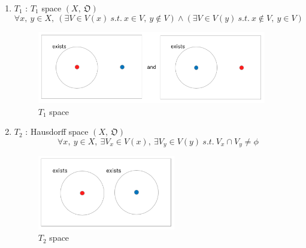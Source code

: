 \documentclass[english,dvipdfmx]{jsarticle}
\begin{document}
\begin{description}
\begin{enumerate}
            \item $T_1$ : $T_1$ space $(X,\ \mathfrak{O})$ \\
                $$\forall x,\ y \in X,\ (\exists V \in V(x) \ s.t. \  x \in V,\ y \notin V ) \land (\exists V \in V(y) \ s.t. \  x \notin V,\ y \in V )$$
                \begin{figure}[H]
                    \begin{center}
                        \includegraphics[clip,width=10cm]{./T1.png}
                        \caption{$T_1$ space}
                    \end{center}
                \end{figure}
            
            \item $T_2$ : Hausdorff space $(X,\ \mathfrak{O})$ \\
                $$\forall x,\ y \in X,\ \exists V_x \in V(x),\ \exists V_y \in V(y) \ s.t. \ V_x \cap V_y \neq \phi $$
                \begin{figure}[H]
                    \begin{center}
                        \includegraphics[clip,width=6cm]{./T2.png}
                        \caption{$T_2$ space}
                    \end{center}
                \end{figure}
            

\end{enumerate}
\end{description}
\end{document}
